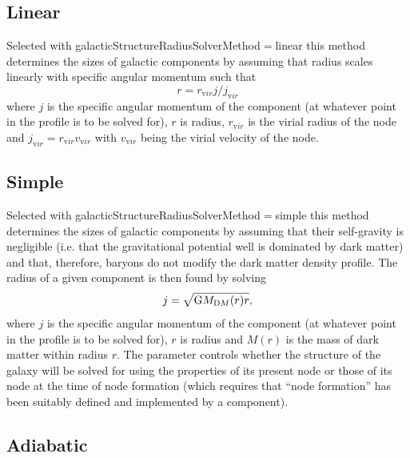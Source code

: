 \subsection{Linear}

Selected with {\normalfont \ttfamily galacticStructureRadiusSolverMethod}$=${\normalfont \ttfamily linear} this method determines the sizes of galactic components by assuming that radius scales linearly with specific angular momentum such that
\begin{equation}
 r = r_{\mathrm vir} j/j_{\mathrm vir}
\end{equation}
where $j$ is the specific angular momentum of the \gls{component} (at whatever point in the profile is to be solved for), $r$ is radius, $r_{\mathrm vir}$ is the virial radius of the \gls{node} and $j_{\mathrm vir}= r_{\mathrm vir} v_{\mathrm vir}$ with $v_{\mathrm vir}$ being the virial velocity of the \gls{node}.

\subsection{Simple}

Selected with {\normalfont \ttfamily galacticStructureRadiusSolverMethod}$=${\normalfont \ttfamily simple} this method determines the sizes of galactic components by assuming that their self-gravity is negligible (i.e. that the gravitational potential well is dominated by dark matter) and that, therefore, baryons do not modify the dark matter density profile. The radius of a given \gls{component} is then found by solving
\begin{equation}
 j = \sqrt{\G M_{\mathrm DM}(r) r},
\end{equation}
where $j$ is the specific angular momentum of the \gls{component} (at whatever point in the profile is to be solved for), $r$ is radius and $M(r)$ is the mass of dark matter within radius $r$. The parameter {\normalfont \ttfamily [adiabaticContractionUseFormationHalo]} controls whether the structure of the galaxy will be solved for using the properties of its present \gls{node} or those of its \gls{node} at the time of \gls{node} formation (which requires that ``node formation'' has been suitably defined and implemented by a component).

\subsection{Adiabatic}

